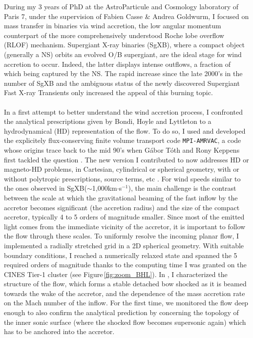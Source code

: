 \documentclass[a4paper,12pt,onecolumn]{article}
\makeatletter
\newcommand{\sgx}{SgXB\xspace}
\newcommand*{\ns}{NS\@\xspace}
\makeatother
\begin{document}
\indent During my 3 years of PhD at the AstroParticule and Cosmology laboratory of Paris 7, under the supervision of Fabien Casse \& Andrea Goldwurm, I focused on mass transfer in binaries via wind accretion, the low angular momentum counterpart of the more comprehensively understood Roche lobe overflow (RLOF) mechanism. Supergiant X-ray binaries (\sgx), where a compact object (generally a \ns) orbits an evolved O/B supergiant, are the ideal stage for wind accretion to occur. Indeed, the latter displays intense outflows, a fraction of which being captured by the \ns. The rapid increase since the late 2000’s in the number of \sgx \citep{Walter15} and the ambiguous status of the newly discovered Supergiant Fast X-ray Transients \citep{Negueruela2006} only increased the appeal of this burning topic.\\ \\
\indent In a first attempt to better understand the wind accretion process, I confronted the analytical prescriptions given by Bondi, Hoyle and Lyttleton \citep{Hoyle:1939fl,Bondi1944} to a hydrodynamical (HD) representation of the flow. To do so, I used and developed the explicitely flux-conserving finite volume transport code \texttt{MPI-AMRVAC}, a code whose origins trace back to the mid 90’s when G\'abor T\'oth and Rony Keppens first tackled the question \citep{Toth1996,Toth1998}. The new version I contributed to now addresses HD or magneto-HD problems, in Cartesian, cylindrical or spherical geometry, with or without polytropic prescriptions, source terms, etc \citep{Xia2017}. For wind speeds similar to the ones observed in \sgx ($\sim$1,000km$\cdot$s$^{-1}$), the main challenge is the contrast between the scale at which the gravitational beaming of the fast inflow by the accretor becomes significant (the accretion radius) and the size of the compact accretor, typically 4 to 5 orders of magnitude smaller. Since most of the emitted light comes from the immediate vicinity of the accretor, it is important to follow the flow through these scales. To uniformly resolve the incoming planar flow, I implemented a radially stretched grid in a 2D spherical geometry. With suitable boundary conditions, I reached a numerically relaxed state and spanned the 5 required orders of magnitude thanks to the computing time I was granted on the CINES Tier-1 cluster (see Figure\,\ref{fig:zoom_BHL}). In \cite{ElMellah2015}, I characterized the structure of the flow, which forms a stable detached bow shocked as it is beamed towards the wake of the accretor, and the dependence of the mass accretion rate on the Mach number of the inflow. For the first time, we monitored the flow deep enough to also confirm the analytical prediction by \cite{Foglizzo1997} concerning the topology of the inner sonic surface (where the shocked flow becomes supersonic again) which has to be anchored into the accretor.\\ \\
\end{document}
